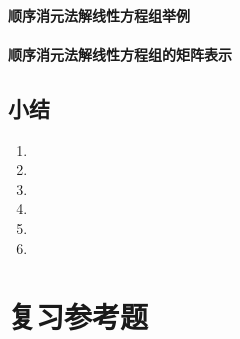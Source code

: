 \subsubsection{顺序消元法解线性方程组举例}
\subsubsection{顺序消元法解线性方程组的矩阵表示}
\begin{Practice}
  \begin{question}
    \item 
    \item 
  \end{question}
\end{Practice}


\begin{Exercise}
  \begin{question}
    \item 
    \item 
  \end{question}
\end{Exercise}

\section*{小结}
\begin{enumerate}[C、,itemindent=4.5em]
  \item 
  \item 
  \item 
  \item 
  \item 
  \item 
\end{enumerate}
\chapter*{复习参考题}
